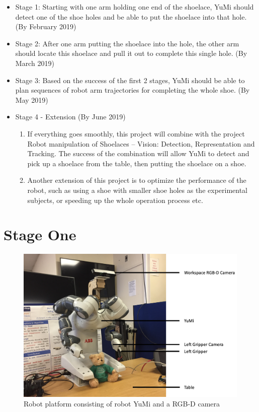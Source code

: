 \begin{itemize}
  \item Stage 1: Starting with one arm holding one end of the shoelace, YuMi should detect one of the shoe holes and be able to put the shoelace into that hole. (By February 2019)
  \item Stage 2: After one arm putting the shoelace into the hole, the other arm should locate this shoelace and pull it out to complete this single hole. (By March 2019)
  \item Stage 3: Based on the success of the first 2 stages, YuMi should be able to plan sequences of robot arm trajectories for completing the whole shoe. (By May 2019)
  \item Stage 4 - Extension (By June 2019)
   \begin{enumerate}
    \item If everything goes smoothly, this project will combine with the project Robot manipulation of Shoelaces – Vision: Detection, Representation and Tracking. The success of the combination will allow YuMi to detect and pick up a shoelace from the table, then putting the shoelace on a shoe. 
    \item Another extension of this project is to optimize the performance of the robot, such as using a shoe with smaller shoe holes as the experimental subjects, or speeding up the whole operation process etc. 
  \end{enumerate}
\end{itemize}

\section{Stage One}

\begin{figure}[h!]
    \centering
    \includegraphics[width = 0.8\columnwidth]{images/yumi1.png}
    \caption{Robot platform consisting of robot YuMi and a RGB-D camera}
\end{figure}

